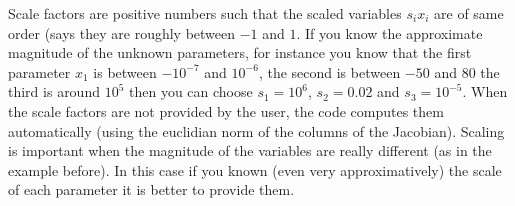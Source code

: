 \begin{mandescription}
Scale factors are positive numbers such that the scaled variables $s_i x_i$ are of same order
(says they are roughly between $-1$ and $1$. If you know the approximate magnitude of the unknown
parameters, for instance you know that the first parameter $x_1$ is between $-10^{-7}$ and $10^{-6}$, 
the second is between $-50$ and $80$ the third is around  $10^{5}$ then you can choose $s_1 = 10^6$, 
$s_2 = 0.02$ and $s_3 = 10^{-5}$. When the scale factors are not provided by the user, the code 
computes them automatically (using the euclidian norm of the columns of the Jacobian). Scaling is 
important when the magnitude of the variables are really different (as in the example before). In 
this case if you known (even very approximatively) the scale of each parameter it is better
to provide them.  


\end{mandescription}
